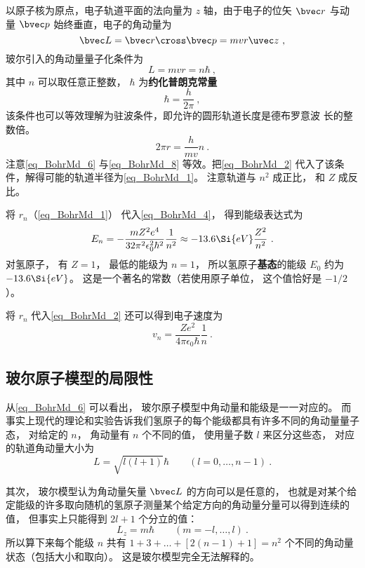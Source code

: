 以原子核为原点，电子轨道平面的法向量为 $z$ 轴，由于电子的位矢 $\bvec r$ 与动量 $\bvec p$ 始终垂直，电子的角动量为
\begin{equation}
\bvec L = \bvec r \cross \bvec p = mvr \uvec z~,
\end{equation}
玻尔引入的角动量量子化条件为
\begin{equation}\label{eq_BohrMd_6}
L = mvr = n\hbar~,
\end{equation}
其中 $n$ 可以取任意正整数， $\hbar$ 为\textbf{约化普朗克常量}
\begin{equation}\label{eq_BohrMd_7}
\hbar  = \frac{h}{2\pi}~,
\end{equation}
该条件也可以等效理解为驻波条件，即允许的圆形轨道长度是德布罗意波%
长的整数倍。
\begin{equation}\label{eq_BohrMd_8}
2\pi r  = \frac{h}{mv} n~.
\end{equation}
注意\autoref{eq_BohrMd_6} 与\autoref{eq_BohrMd_8} 等效。把\autoref{eq_BohrMd_2} 代入了该条件，解得可能的轨道半径为\autoref{eq_BohrMd_1}。 注意轨道与 $n^2$ 成正比， 和 $Z$ 成反比。

将 $r_n$（\autoref{eq_BohrMd_1}） 代入\autoref{eq_BohrMd_4}， 得到能级表达式为
\begin{equation}\label{eq_BohrMd_11}
E_n =  - \frac{mZ^2 e^4}{32\pi^2\epsilon_0^2 \hbar ^2} \frac{1}{n^2} \approx  - 13.6\Si{eV}\frac{Z^2}{n^2}~.
\end{equation}
对氢原子， 有 $Z = 1$， 最低的能级为 $n = 1$， 所以氢原子\textbf{基态}的能级 $E_0$ 约为 $-13.6\Si{eV}$。 这是一个著名的常数（若使用原子单位， 这个值恰好是 $-1/2$）。

将 $r_n$ 代入\autoref{eq_BohrMd_2} 还可以得到电子速度为
\begin{equation}\label{eq_BohrMd_10}
v_n = \frac{Z e^2}{4\pi\epsilon_0\hbar} \frac{1}{n}~.
\end{equation}

\subsection{玻尔原子模型的局限性}
从\autoref{eq_BohrMd_6} 可以看出， 玻尔原子模型中角动量和能级是一一对应的。 而事实上现代的理论和实验告诉我们氢原子的每个能级都具有许多不同的角动量量子态， 对给定的 $n$， 角动量有 $n$ 个不同的值， 使用量子数 $l$ 来区分这些态， 对应的轨道角动量大小为
\begin{equation}
L = \sqrt{l(l+1)}\hbar \qquad (l = 0,\dots,n-1)~.
\end{equation}

其次， 玻尔模型认为角动量矢量 $\bvec L$ 的方向可以是任意的， 也就是对某个给定能级的许多取向随机的氢原子测量某个给定方向的角动量分量可以得到连续的值， 但事实上只能得到 $2l+1$ 个分立的值：
\begin{equation}
L_z = m\hbar \qquad (m = -l,\dots,l)~.
\end{equation}
所以算下来每个能级 $n$ 共有 $1+3+\dots+[2(n-1)+1] = n^2$ 个不同的角动量状态（包括大小和取向）。 这是玻尔模型完全无法解释的。


